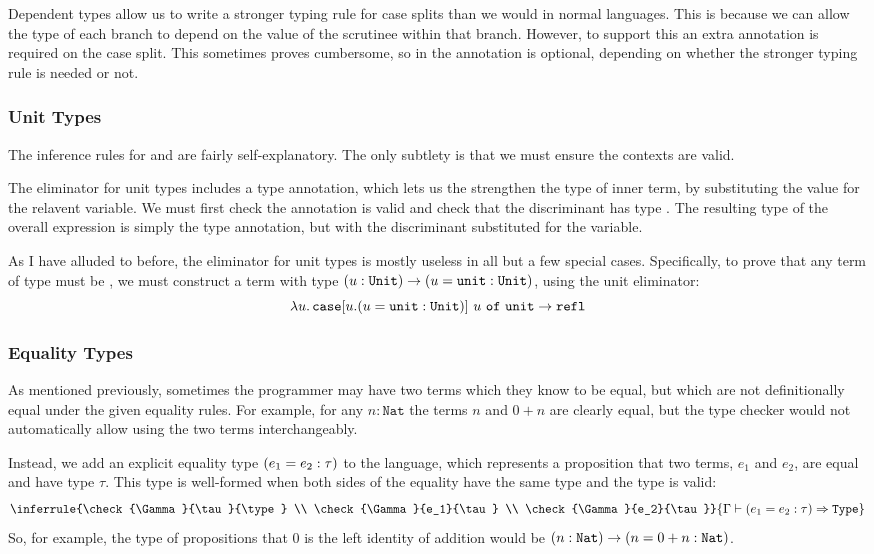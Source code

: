\documentclass[12pt,a4paper,twoside]{report}
\begin{document}
Dependent types allow us to write a stronger typing rule for case splits than we would in normal languages.
This is because we can allow the type of each branch to depend on the value of the scrutinee within that branch.
However, to support this an extra annotation is required on the case split.
This sometimes proves cumbersome, so in \pimu{} the annotation is optional, depending on whether the stronger typing rule is needed or not.

\subsubsection{Unit Types}

The inference rules for \Unit{} and \unit{} are fairly self-explanatory.
The only subtlety is that we must ensure the contexts are valid.

The eliminator for unit types includes a type annotation, which lets us the strengthen the type of inner term, by substituting the value \unit{} for the relavent variable.
We must first check the annotation is valid and check that the discriminant has type \Unit{}.
The resulting type of the overall expression is simply the type annotation, but with the discriminant substituted for the variable.

As I have alluded to before, the eliminator for unit types is mostly useless in all but a few special cases.
Specifically, to prove that any term of type \Unit{} must be \unit{}, we must construct a term with type \((u : \mathtt{Unit}) \rightarrow (u = \mathtt{unit} : \mathtt{Unit})\), using the unit eliminator:
\[
    \lambda u \ldotp \texttt{case}[u.(u = \mathtt{unit} : \mathtt{Unit})]\ u\ \texttt{of}\ \texttt{unit} \rightarrow \mathtt{refl}
\]

\subsubsection{Equality Types}

As mentioned previously, sometimes the programmer may have two terms which they know to be equal, but which are not definitionally equal under the given equality rules.
For example, for any \(n : \mathtt{Nat}\) the terms \(n\) and \(0 + n\) are clearly equal, but the type checker would not automatically allow using the two terms interchangeably.

Instead, we add an explicit equality type \((e_1 = e_2 : \tau)\) to the language, which represents a proposition that two terms, \(e_1\) and \(e_2\), are equal and have type \(\tau\).
This type is well-formed when both sides of the equality have the same type and the type is valid:
\[
    \inferrule{\check{\Gamma}{\tau}{\type} \\ \check{\Gamma}{e_1}{\tau} \\ \check{\Gamma}{e_2}{\tau}} {\infer{\Gamma}{\eq{e_1}{e_2}{\tau}}{\type}}
\]
So, for example, the type of propositions that \(0\) is the left identity of addition would be \((n : \texttt{Nat}) \rightarrow (n = 0 + n : \texttt{Nat})\).
\end{document}
